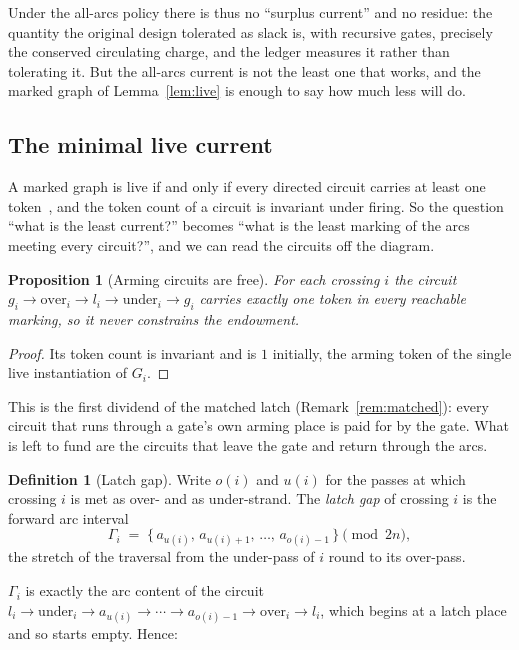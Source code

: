 \documentclass[11pt]{article}
\newtheorem{proposition}{Proposition}
\theoremstyle{definition}
\newtheorem{definition}{Definition}
\begin{document}
Under the all-arcs policy there is thus no ``surplus current'' and no residue: the
quantity the original design tolerated as slack is, with recursive gates,
precisely the conserved circulating charge, and the ledger measures it rather
than tolerating it. But the all-arcs current is not the least one that works, and
the marked graph of Lemma~\ref{lem:live} is enough to say how much less will do.

\subsection*{The minimal live current}

A marked graph is live if and only if every directed circuit carries at least one
token~\cite{marked}, and the token count of a circuit is invariant under firing.
So the question ``what is the least current?'' becomes ``what is the least marking
of the arcs meeting every circuit?'', and we can read the circuits off the
diagram.

\begin{proposition}[Arming circuits are free]\label{prop:arming}
For each crossing $i$ the circuit $g_i \to \mathrm{over}_i \to l_i \to
\mathrm{under}_i \to g_i$ carries exactly one token in every reachable marking,
so it never constrains the endowment.
\end{proposition}
\begin{proof}
Its token count is invariant and is $1$ initially, the arming token of the single
live instantiation of $G_i$.
\end{proof}

This is the first dividend of the matched latch (Remark~\ref{rem:matched}): every
circuit that runs through a gate's own arming place is paid for by the gate. What
is left to fund are the circuits that leave the gate and return through the arcs.

\begin{definition}[Latch gap]\label{def:gap}
Write $o(i)$ and $u(i)$ for the passes at which crossing $i$ is met as over- and
as under-strand. The \emph{latch gap} of crossing $i$ is the forward arc interval
\[
\Gamma_i \;=\; \{\, a_{u(i)},\, a_{u(i)+1},\, \dots,\, a_{o(i)-1} \,\}
\pmod{2n},
\]
the stretch of the traversal from the under-pass of $i$ round to its over-pass.
\end{definition}

$\Gamma_i$ is exactly the arc content of the circuit $l_i \to \mathrm{under}_i \to
a_{u(i)} \to \cdots \to a_{o(i)-1} \to \mathrm{over}_i \to l_i$, which begins at a
latch place and so starts empty. Hence:
\end{document}
